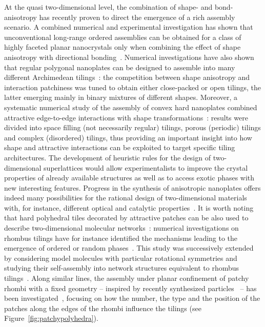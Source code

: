 \documentclass[a4paper,twocolumn]{revtex4}
\begin{document}
At the quasi two-dimensional level, the combination of shape- and bond-anisotropy has recently proven to direct the emergence of a rich assembly scenario.  A combined numerical and experimental investigation has shown that unconventional long-range ordered assemblies can be obtained for a class of highly faceted planar nanocrystals only when combining the effect of shape anisotropy with directional bonding~\cite{Ye2013}. Numerical investigations have also shown that regular polygonal nanoplates can be designed to assemble into many different Archimedean tilings~\cite{Millan2014}: the competition between shape anisotropy and interaction patchiness was tuned to obtain either close-packed or open tilings, the latter emerging mainly in binary mixtures of different shapes. Moreover, a systematic numerical study of the assembly of convex hard nanoplates combined attractive edge-to-edge interactions with shape transformations~\cite{Millan2015}: results were divided into space filling (not necessarily regular) tilings, porous (periodic) tilings and complex (disordered) tilings, thus providing an important insight into how shape and attractive interactions can be exploited to target specific tiling architectures. The development of heuristic rules for the design of two-dimensional superlattices would allow experimentalists to improve the crystal properties of already available structures as well as to access exotic phases with new interesting features.   Progress in the synthesis of anisotropic nanoplates offers indeed many possibilities for the rational design of two-dimensional materials with, for instance, different optical and catalytic properties~\cite{Efros2011,Gratzel2011}.  It is worth noting that hard polyhedral tiles decorated by attractive patches can be also used to describe two-dimensional molecular networks~\cite{Blunt2008}: numerical investigations on rhombus tilings have for instance identified the mechanisms leading to the emergence of ordered or random phases~\cite{Whitelam2012}. This study was successively extended by considering model molecules with particular rotational symmetries and studying their self-assembly into network structures equivalent to rhombus tilings~\cite{Whitelam2015}. Along similar lines, the assembly under planar confinement of patchy rhombi with a fixed geometry -- inspired by recently  synthesized particles~\cite{Miriam2015} -- has been investigated~\cite{Carina}, focusing on how the number, the type and the position of the patches along the edges of the rhombi influence the tilings (see Figure~\ref{fig:patchypolyhedra}).
\end{document}
